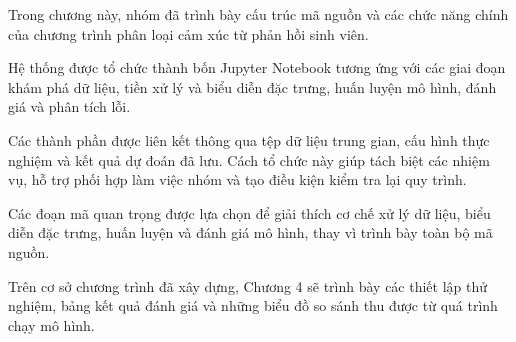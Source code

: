 Trong chương này, nhóm đã trình bày cấu trúc mã nguồn và các chức năng chính của chương trình phân loại cảm xúc từ phản hồi sinh viên.

Hệ thống được tổ chức thành bốn Jupyter Notebook tương ứng với các giai đoạn khám phá dữ liệu, tiền xử lý và biểu diễn đặc trưng, huấn luyện mô hình, đánh giá và phân tích lỗi.

Các thành phần được liên kết thông qua tệp dữ liệu trung gian, cấu hình thực nghiệm và kết quả dự đoán đã lưu. Cách tổ chức này giúp tách biệt các nhiệm vụ, hỗ trợ phối hợp làm việc nhóm và tạo điều kiện kiểm tra lại quy trình.

Các đoạn mã quan trọng được lựa chọn để giải thích cơ chế xử lý dữ liệu, biểu diễn đặc trưng, huấn luyện và đánh giá mô hình, thay vì trình bày toàn bộ mã nguồn.

Trên cơ sở chương trình đã xây dựng, Chương 4 sẽ trình bày các thiết lập thử nghiệm, bảng kết quả đánh giá và những biểu đồ so sánh thu được từ quá trình chạy mô hình.
